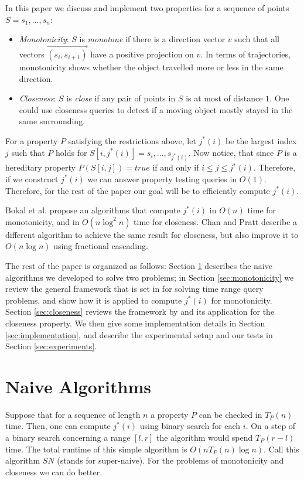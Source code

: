 \documentclass{article}
\begin{document}
In this paper we discuss and implement two properties for a sequence of points $S = s_1, \dots, s_n$:
\begin{itemize}
    \item \textit{Monotonicity}:  $S$ is \textit{monotone} if there is a direction vector $v$ such that all vectors $\vec{(s_i, s_{i+1})}$ have a positive projection on $v$. In terms of trajectories, monotonicity shows whether the object travelled more or less in the same direction.
    
    \item \textit{Closeness}: $S$ is \textit{close} if any pair of points in $S$ is at most of distance $1$. One could use closeness queries to detect if a moving object mostly stayed in the same surrounding.
\end{itemize}

For a property $P$ satisfying the restrictions above, let $j^*(i)$ be the largest index $j$ such that $P$ holds for $S[i, j^*(i)] = s_i, \dots, s_{j^*(i)}$. Now notice, that since $P$ is a hereditary property $P(S[i, j]) = true$ if and only if $i \leq j \leq j^*(i)$. Therefore, if we construct $j^*(i)$ we can answer property testing queries in $O(1)$. Therefore, for the rest of the paper our goal will be to efficiently compute $j^*(i)$.

Bokal et al. \cite{bokal2015} propose an algorithms that compute $j^*(i)$ in $O(n)$ time for monotonicity, and in $O(n\log^2 n)$ time for closeness. Chan and Pratt \cite{chan2016} describe a different algorithm to achieve the same result for closeness, but also improve it to $O(n\log n)$ using fractional cascading.

The rest of the paper is organized as follows: Section \ref{sec:naive}
describes the naive algorithms we developed to solve two problems; in Section \ref{sec:monotonicity} we review the general
framework that is set in \cite{bokal2015} for solving time range
query problems, and show how it is applied to compute $j^*(i)$ for
monotonicity. Section \ref{sec:closeness} reviews the framework by
\cite{chan2016} and its application for the closeness property. We
then give some implementation details in Section \ref{sec:implementation},
and describe the experimental setup and our tests in Section
\ref{sec:experiments}.

\section{Naive Algorithms}
\label{sec:naive}
Suppose that for a sequence of length $n$ a property $P$ can be checked in $T_P(n)$ time. Then, one can compute $j^*(i)$ using binary search for each $i$. On a step of a binary search concerning a range $[l, r]$ the algorithm would spend $T_P(r - l)$ time. The total runtime of this simple algorithm is $O(nT_P(n)\log n)$. Call this algorithm $SN$ (stands for super-naive). For the problems of monotonicity and closeness we can do better.
\end{document}
